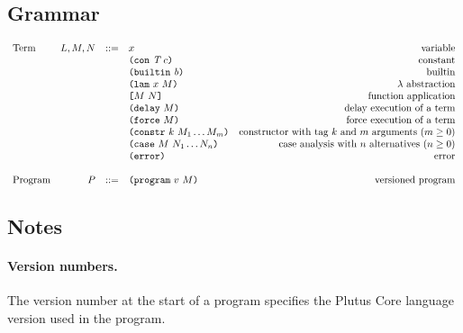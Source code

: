 \subsection{Grammar}
\begin{minipage}{\linewidth}
    \centering
    \[\begin{array}{lrclr}
    \textrm{Term}       & L,M,N  & ::= & x                               & \textrm{variable}\\
                        &        &     & \texttt{(} \texttt{con} ~ \textit{T} ~ c \texttt{)}                    & \textrm{constant}\\
                        &        &     & \texttt{(} \texttt{builtin} ~ \mathit{b} \texttt{)}                     & \textrm{builtin}\\
                        &        &     & \texttt{(} \texttt{lam} ~ x ~ M  \texttt{)}                     & \textrm{$\lambda$ abstraction}\\
                        &        &     & \texttt{[} M ~ N \texttt{]}                     & \textrm{function application}\\
                        &        &     & \texttt{(} \texttt{delay} ~ M \texttt{)}                       & \textrm{delay execution of a term}\\
                        &        &     & \texttt{(} \texttt{force} ~ M \texttt{)}                       & \textrm{force execution of a term}\\
                        &        &     & \texttt{(} \texttt{constr} ~ k ~ M_1 \ldots M_m \texttt{)}      & \textrm{constructor with tag $k$ and $m$ arguments ($m \geq 0$)}\\
                        &        &     & \texttt{(} \texttt{case} ~ M ~ N_1 \ldots N_n \texttt{)}        & \textrm{case analysis with $n$ alternatives ($n \geq 0$)}\\
                        &        &     & \texttt{(} \texttt{error} \texttt{)}                         & \textrm{error}\\ \\
        \textrm{Program}& P      & ::= & \texttt{(} \texttt{program} ~ v ~ M \texttt{)}                  & \textrm{versioned program}
    \end{array}\]
    \label{fig:untyped-grammar}
\end{minipage}


\subsection{Notes}
\label{sec:grammar-notes}
\paragraph{Version numbers.} The version number at the start of a program specifies
the Plutus Core language version used in the program.

